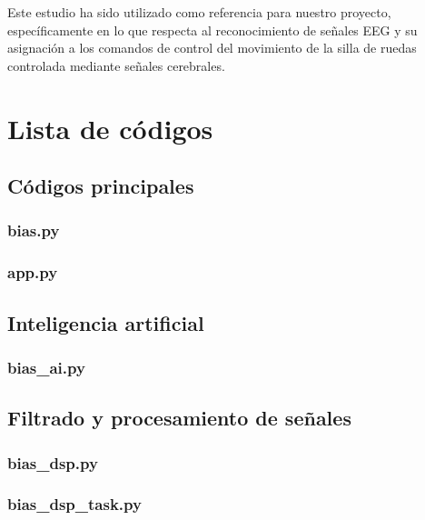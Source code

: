 \documentclass{article}
\begin{document}
Este estudio ha sido utilizado como referencia para nuestro proyecto, específicamente en lo que respecta al reconocimiento de señales EEG y su asignación a los comandos de control del movimiento de la silla de ruedas controlada mediante señales cerebrales.



\section{Lista de códigos}

\subsection{Códigos principales}

\subsubsection{bias.py}


\subsubsection{app.py}


\subsection{Inteligencia artificial}

\subsubsection{bias\_ai.py}


\subsection{Filtrado y procesamiento de señales}

\subsubsection{bias\_dsp.py}

\subsubsection{bias\_dsp\_task.py}
\end{document}

